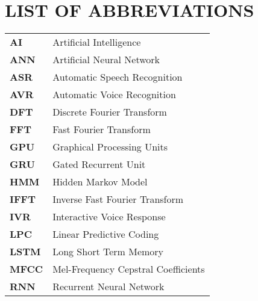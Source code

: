 \section*{LIST OF ABBREVIATIONS}

{
  \renewcommand{\arraystretch}{1.1}

  \begin{tabular}{ll}
    \textbf{AI} & Artificial Intelligence \\
    \textbf{ANN} & Artificial Neural Network \\
	\textbf{ASR} & Automatic Speech Recognition \\
	\textbf{AVR} & Automatic Voice Recognition \\
	\textbf{DFT} & Discrete Fourier Transform \\
	\textbf{FFT} & Fast Fourier Transform \\
	\textbf{GPU} & Graphical Processing Units \\ 
	\textbf{GRU} & Gated Recurrent Unit \\
	\textbf{HMM} & Hidden Markov Model \\   
	\textbf{IFFT} & Inverse Fast Fourier Transform \\
	\textbf{IVR} & Interactive Voice Response \\
	\textbf{LPC} & Linear Predictive Coding \\
	\textbf{LSTM} & Long Short Term Memory \\
	\textbf{MFCC} & Mel-Frequency Cepstral Coefficients \\	
    \textbf{RNN} & Recurrent Neural Network \\
      
  \end{tabular}
}
